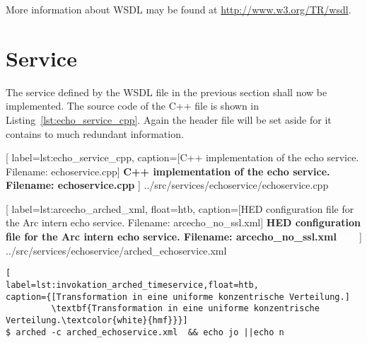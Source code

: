More information about WSDL may be found at \href{http://www.w3.org/TR/wsdl}{http://www.w3.org/TR/wsdl}.







\section{Service}

The service defined by the WSDL file in the previous section shall now be implemented. The source code of the C++ file is shown in Listing~\ref{lst:echo_service_cpp}. Again the header file will be set aside for it contains to much redundant information.


	[
	label=lst:echo_service_cpp,
	caption={[C++ implementation of the echo service. Filename: echoservice.cpp]
	\textbf{C++ implementation of the echo service. Filename: echoservice.cpp}}
	]
{../src/services/echoservice/echoservice.cpp}




	[
	label=lst:arcecho_arched_xml, float=htb,
	caption={[HED configuration file for the Arc intern echo service. Filename: arcecho\_no\_ssl.xml]
	\textbf{HED configuration file for the Arc intern echo service. Filename: arcecho\_no\_ssl.xml\textcolor{white}{hmf}}}
	]
{../src/services/echoservice/arched_echoservice.xml}





\begin{lstlisting}[
label=lst:invokation_arched_timeservice,float=htb,
caption={[Transformation in eine uniforme konzentrische Verteilung.]
         \textbf{Transformation in eine uniforme konzentrische Verteilung.\textcolor{white}{hmf}}}]
$ arched -c arched_echoservice.xml  && echo jo ||echo n
\end{lstlisting}




